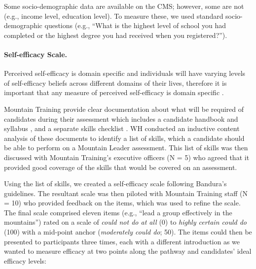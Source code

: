 \documentclass[
  12pt,
  a4paper,
]{book}
\begin{document}
Some socio-demographic data are available on the CMS; however, some are not (e.g., income level, education level). To measure these, we used standard socio-demographic questions (e.g., ``What is the highest level of school you had completed or the highest degree you had received when you registered?'').

\hypertarget{self-efficacy-scale.}{%
\paragraph{Self-efficacy Scale.}\label{self-efficacy-scale.}}

Perceived self-efficacy is domain specific and individuals will have varying levels of self-efficacy beliefs across different domains of their lives, therefore it is important that any measure of perceived self-efficacy is domain specific \citep{Bandura1997, Bandura2006}.

Mountain Training provide clear documentation about what will be required of candidates during their assessment which includes a candidate handbook and syllabus \citep{MTUK2015a}, and a separate skills checklist \citep{MTUK2015}. WH conducted an inductive content analysis \citep{Cho2014} of these documents to identify a list of skills, which a candidate should be able to perform on a Mountain Leader assessment. This list of skills was then discussed with Mountain Training's executive officers (N = 5) who agreed that it provided good coverage of the skills that would be covered on an assessment.

Using the list of skills, we created a self-efficacy scale following Bandura's \citeyearpar{Bandura2006} guidelines. The resultant scale was then piloted with Mountain Training staff (N = 10) who provided feedback on the items, which was used to refine the scale. The final scale comprised eleven items (e.g., ``lead a group effectively in the mountains'') rated on a scale of \emph{could not do at all} (0) to \emph{highly certain could do} (100) with a mid-point anchor (\emph{moderately could do}; 50). The items could then be presented to participants three times, each with a different introduction as we wanted to measure efficacy at two points along the pathway and candidates' ideal efficacy levels:
\end{document}
